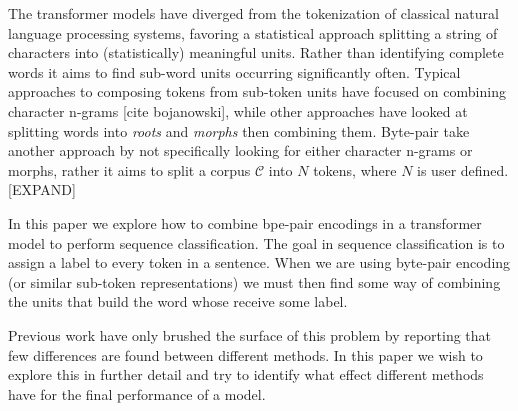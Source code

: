 \documentclass[11pt]{article}
\begin{document}
	The transformer models have diverged from the tokenization of classical natural language processing systems, favoring a statistical approach splitting a string of characters into (statistically) meaningful units. Rather than identifying complete words it aims to find sub-word units occurring significantly often. Typical approaches to composing tokens from sub-token units have focused on combining character n-grams [cite bojanowski], while other approaches have looked at splitting words into \textit{roots} and \textit{morphs} then combining them. Byte-pair take another approach by not specifically looking for either character n-grams or morphs, rather it aims to split a corpus $\mathcal{C}$ into $N$ tokens, where $N$ is user defined. [EXPAND]
	
	In this paper we explore how to combine bpe-pair encodings in a transformer model to perform sequence classification. The goal in sequence classification is to assign a label to every token in a sentence. When we are using byte-pair encoding (or similar sub-token representations) we must then find some way of combining the units that build the word whose receive some label. 
	
	Previous work have only brushed the surface of this problem by reporting that few differences are found between different methods. In this paper we wish to explore this in further detail and try to identify what effect different methods have for the final performance of a model.  
	
    
	
\end{document}
